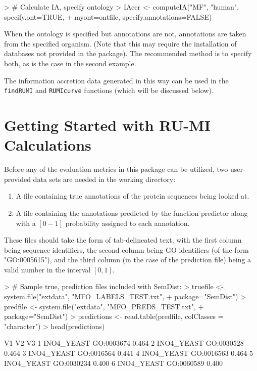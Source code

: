 \documentclass{article}
\begin{document}
\begin{Schunk}
\begin{Sinput}
> # Calculate IA, specify ontology
> IAccr <- computeIA("MF", "human", specify.ont=TRUE,
+          myont=ontfile, specify.annotations=FALSE)
\end{Sinput}
\end{Schunk}


When the ontology is specified but annotations are not, annotations are taken from the specified organism. (Note that this may require the installation of databases not provided in the package). The recommended method is to specify both, as is the case in the second example. 

The information accretion data generated in this way can be used in the \texttt{findRUMI} and \texttt{RUMIcurve} functions (which will be discussed below).

\section{Getting Started with RU-MI Calculations}

Before any of the evaluation metrics in this package can be utilized, two user-provided data sets are needed in the working directory:
\begin{enumerate}
\item A file containing true annotations of the protein sequences being looked at.
\item A file containing the annotations predicted by the function predictor along with a $[0-1]$ probability assigned to each annotation.
\end{enumerate}

These files should take the form of tab-delineated text, with the first column being sequence identifiers, the second column being GO identifiers (of the form "GO:0005615"), and the third column (in the case of the prediction file) being a valid number in the interval $[0,1]$.

\begin{Schunk}
\begin{Sinput}
> # Sample true, prediction files included with SemDist:
> truefile <- system.file("extdata", "MFO_LABELS_TEST.txt", 
+                         package="SemDist")
> predfile <- system.file("extdata", "MFO_PREDS_TEST.txt", 
+                         package="SemDist")
> predictions <- read.table(predfile, colClasses = "character")
> head(predictions)
\end{Sinput}
\begin{Soutput}
          V1         V2    V3
1 INO4_YEAST GO:0003674 0.464
2 INO4_YEAST GO:0030528 0.464
3 INO4_YEAST GO:0016564 0.441
4 INO4_YEAST GO:0016563 0.464
5 INO4_YEAST GO:0030234 0.400
6 INO4_YEAST GO:0060589 0.400
\end{Soutput}
\end{Schunk}
\end{document}

